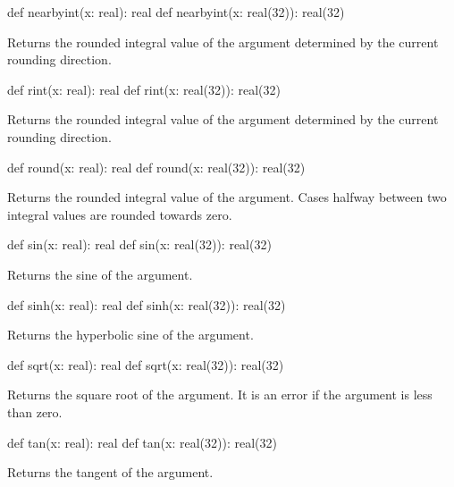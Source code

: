 \begin{protohead}
def nearbyint(x: real): real
def nearbyint(x: real(32)): real(32)
\end{protohead}
\begin{protobody}
Returns the rounded integral value of the argument determined by the
current rounding direction.
\end{protobody}

\begin{protohead}
def rint(x: real): real
def rint(x: real(32)): real(32)
\end{protohead}
\begin{protobody}
Returns the rounded integral value of the argument determined by the
current rounding direction.
\end{protobody}

\begin{protohead}
def round(x: real): real
def round(x: real(32)): real(32)
\end{protohead}
\begin{protobody}
Returns the rounded integral value of the argument.  Cases halfway
between two integral values are rounded towards zero.
\end{protobody}

\begin{protohead}
def sin(x: real): real
def sin(x: real(32)): real(32)
\end{protohead}
\begin{protobody}
Returns the sine of the argument.
\end{protobody}

\begin{protohead}
def sinh(x: real): real
def sinh(x: real(32)): real(32)
\end{protohead}
\begin{protobody}
Returns the hyperbolic sine of the argument.
\end{protobody}

\begin{protohead}
def sqrt(x: real): real
def sqrt(x: real(32)): real(32)
\end{protohead}
\begin{protobody}
Returns the square root of the argument.  It is an error if the
argument is less than zero.
\end{protobody}

\begin{protohead}
def tan(x: real): real
def tan(x: real(32)): real(32)
\end{protohead}
\begin{protobody}
Returns the tangent of the argument.
\end{protobody}

